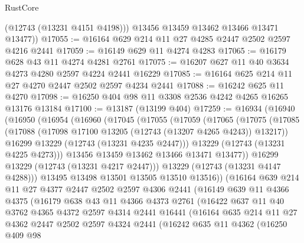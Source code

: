 \begin{lexlean}{RustCore}
\begin{coremodule}
          (@12743 (@13231 @4151 @4198)))
        @13456
        @13459
        @13462
        @13466
        @13471
        @13477))
@17055 := @16164 @629 @214 @11 @27 @4285 @2447 @2502 @2597 @4216 @2441
@17059 := @16149 @629 @11 @4274 @4283
@17065 := @16179 @628 @43 @11 @4274 @4281 @2761
@17075 := @16207 @627 @11 @40 @3634 @4273 @4280 @2597 @4224 @2441 @16229
@17085 := @16164 @625 @214 @11 @27 @4270 @2447 @2502 @2597 @4234 @2441
@17088 := @16242 @625 @11 @4270
@17098 := @16250 @404 @98 @11 @3308 @2536 @4242 @4265 @16265 @13176 @13184
@17100 := @13187 (@13199 @404)
@17259 := @16934
    (@16940
      (@16950
        (@16954
          (@16960
            (@17045
              (@17055
                (@17059
                  (@17065
                    (@17075
                      (@17085
                        (@17088 (@17098 @17100 @13205 (@12743 (@13207 @4265 @4243)) @13217))
                        @16299
                        @13229
                        (@12743 (@13231 @4235 @2447)))
                      @13229
                      (@12743 (@13231 @4225 @4273)))
                    @13456
                    @13459
                    @13462
                    @13466
                    @13471
                    @13477))
                @16299
                @13229
                (@12743 (@13231 @4217 @2447)))
              @13229
              (@12743 (@13231 @4147 @4288)))
            @13495
            @13498
            @13501
            @13505
            @13510
            @13516))
        (@16164
          @639
          @214
          @11
          @27
          @4377
          @2447
          @2502
          @2597
          @4306
          @2441
          (@16149
            @639
            @11
            @4366
            @4375
            (@16179
              @638
              @43
              @11
              @4366
              @4373
              @2761
              (@16422
                @637
                @11
                @40
                @3762
                @4365
                @4372
                @2597
                @4314
                @2441
                @16441
                (@16164
                  @635
                  @214
                  @11
                  @27
                  @4362
                  @2447
                  @2502
                  @2597
                  @4324
                  @2441
                  (@16242
                    @635
                    @11
                    @4362
                    (@16250
                      @409
                      @98

\end{coremodule}
\end{lexlean}
